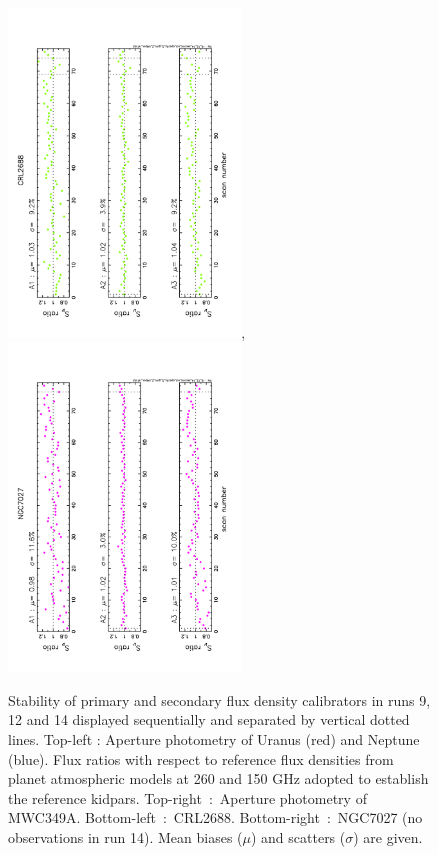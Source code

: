 \begin{figure}[ht!]
\begin{center}
    \includegraphics[clip=true,angle=-90.,width=0.55\textwidth]{Figures/Aperture_photo/CRL2688_Flux_ratio_index_A1_A2_A3.pdf},\includegraphics[clip=true,angle=-90.,width=0.55\textwidth]{Figures/Aperture_photo/NGC7027_Flux_ratio_index_A1_A2_A3.pdf}
    \caption{Stability of primary and secondary flux density calibrators in runs 9, 12 and 14 displayed sequentially and separated by vertical dotted lines. Top-left : Aperture photometry of Uranus (red) and Neptune (blue). Flux ratios with respect to
reference flux densities from planet atmospheric models at 260 and 150 GHz adopted to establish the  reference kidpars.  
 Top-right~:~Aperture photometry of MWC349A. Bottom-left~:~CRL2688. Bottom-right~:~NGC7027 (no
 observations in run 14).     
Mean biases ($\mu$) and scatters ($\sigma$) are given.}
    \label{fig:stab}
  \end{center}
\end{figure}


